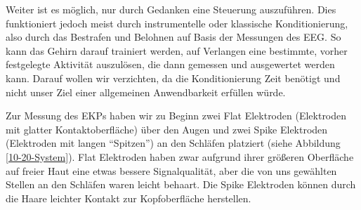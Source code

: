 \documentclass[11pt]{scrartcl}
\begin{document}
	\begin{figure}[h!]
	\end{figure}

	Weiter ist es möglich, nur durch Gedanken eine Steuerung auszuführen. Dies funktioniert jedoch meist durch instrumentelle oder klassische Konditionierung, also durch das Bestrafen und Belohnen auf Basis der Messungen des EEG. So kann das Gehirn darauf trainiert werden, auf Verlangen eine bestimmte, vorher festgelegte Aktivität auszulösen, die dann gemessen und ausgewertet werden kann. \cite{BCIChaudhary} Darauf wollen wir verzichten, da die Konditionierung Zeit benötigt und nicht unser Ziel einer allgemeinen Anwendbarkeit erfüllen würde.
	

	Zur Messung des EKPs haben wir zu Beginn zwei Flat Elektroden (Elektroden mit glatter Kontaktoberfläche) über den Augen und zwei Spike Elektroden (Elektroden mit langen \enquote{Spitzen}) an den Schläfen platziert (siehe Abbildung \ref{10-20-System}). Flat Elektroden haben zwar aufgrund ihrer größeren Oberfläche auf freier Haut eine etwas bessere Signalqualität, aber die von uns gewählten Stellen an den Schläfen waren leicht behaart. Die Spike Elektroden können durch die Haare leichter Kontakt zur Kopfoberfläche herstellen.

	\begin{figure}[h!]
	\end{figure}
\end{document}
